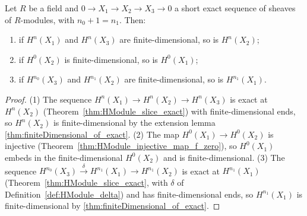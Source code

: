 \begin{theorem}
  \label{thm:HModule_finiteness_transfer}
  \leanok
  Let \(R\) be a field and \(0 \to X_1 \to X_2 \to X_3 \to 0\) a short exact sequence of sheaves
  of \(R\)-modules, with \(n_0 + 1 = n_1\). Then:
  \begin{enumerate}
    \item if \(H^n(X_1)\) and \(H^n(X_3)\) are finite-dimensional, so is \(H^n(X_2)\);
    \item if \(H^0(X_2)\) is finite-dimensional, so is \(H^0(X_1)\);
    \item if \(H^{n_0}(X_3)\) and \(H^{n_1}(X_2)\) are finite-dimensional, so is \(H^{n_1}(X_1)\).
  \end{enumerate}
\end{theorem}
\begin{proof}
  \leanok
  (1) The sequence \(H^n(X_1) \to H^n(X_2) \to H^n(X_3)\) is exact at \(H^n(X_2)\)
  (Theorem~\ref{thm:HModule_slice_exact}) with finite-dimensional ends, so \(H^n(X_2)\) is
  finite-dimensional by the extension lemma \ref{thm:finiteDimensional_of_exact}. (2) The map
  \(H^0(X_1) \to H^0(X_2)\) is injective (Theorem~\ref{thm:HModule_injective_map_f_zero}), so
  \(H^0(X_1)\) embeds in the finite-dimensional \(H^0(X_2)\) and is finite-dimensional. (3) The
  sequence \(H^{n_0}(X_3) \xrightarrow{\delta} H^{n_1}(X_1) \to H^{n_1}(X_2)\) is exact at
  \(H^{n_1}(X_1)\) (Theorem~\ref{thm:HModule_slice_exact}, with \(\delta\) of
  Definition~\ref{def:HModule_delta}) and has finite-dimensional ends, so \(H^{n_1}(X_1)\) is
  finite-dimensional by \ref{thm:finiteDimensional_of_exact}.
\end{proof}

